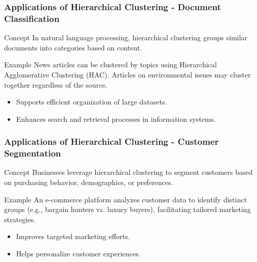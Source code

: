 \documentclass[aspectratio=169]{beamer}
\begin{document}
\begin{frame}[fragile]
    \frametitle{Applications of Hierarchical Clustering - Document Classification}
    \begin{block}{Concept}
        In natural language processing, hierarchical clustering groups similar documents into categories based on content.
    \end{block}
    
    \begin{block}{Example}
        News articles can be clustered by topics using Hierarchical Agglomerative Clustering (HAC). Articles on environmental issues may cluster together regardless of the source.
    \end{block}
    
    \begin{itemize}
        \item Supports efficient organization of large datasets.
        \item Enhances search and retrieval processes in information systems.
    \end{itemize}
\end{frame}

\begin{frame}[fragile]
    \frametitle{Applications of Hierarchical Clustering - Customer Segmentation}
    \begin{block}{Concept}
        Businesses leverage hierarchical clustering to segment customers based on purchasing behavior, demographics, or preferences.
    \end{block}
    
    \begin{block}{Example}
        An e-commerce platform analyzes customer data to identify distinct groups (e.g., bargain hunters vs. luxury buyers), facilitating tailored marketing strategies.
    \end{block}
    
    \begin{itemize}
        \item Improves targeted marketing efforts.
        \item Helps personalize customer experiences.
    \end{itemize}
\end{frame}
\end{document}
